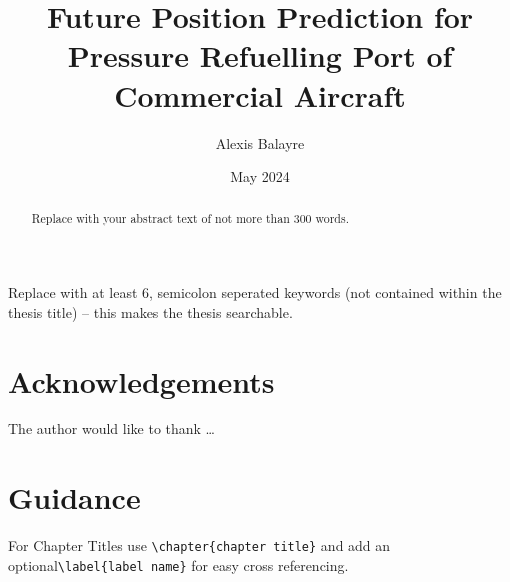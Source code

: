 \documentclass[12pt,oneside]{book} %
\title{Future Position Prediction for Pressure Refuelling Port
of Commercial Aircraft}
\author{Alexis Balayre}
\date{May 2024}
\begin{document}
%
%

\frontmatter

\maketitle
    
\begin{abstract}
Replace with your abstract text of not more than 300 words.
\end{abstract}

\begin{keywords}
Replace with at least 6, semicolon seperated keywords (not contained within the thesis title) – this makes the thesis searchable.
\end{keywords}

\chapter{Acknowledgements}
The author would like to thank \dots

{
\clearpage
\singlespacing
{
\tableofcontents
}
\clearpage

\listoffigures

\clearpage
\listoftables
}

\begin{listofabbreviations}
\end{listofabbreviations}





%
%
\mainmatter
\pagestyle{fancy}
\fancyhead[L]{\nouppercase{\leftmark}}
\fancyhead[R]{\nouppercase{\rightmark}}

\chapter{Guidance}
\label{chap:Guidance}
For Chapter Titles use \verb#\chapter{chapter title}# and add an optional\linebreak \verb#\label{label name}# for easy cross referencing. 
\end{document}
